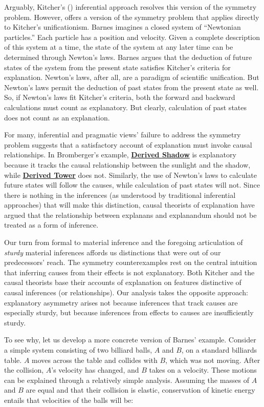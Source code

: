 \documentclass{article}                     %
\begin{document}
Arguably, Kitcher's (\citeyear{Kitcher1989}) inferential approach resolves this version of the symmetry problem. However, \cite{Barnes1992} offers a version of the symmetry problem that applies directly to Kitcher's unificationism.  Barnes imagines a closed system of ``Newtonian particles.''  Each particle has a position and velocity.  Given a complete description of this system at a time, the state of the system at any later time can be determined through Newton's laws.  Barnes argues that the deduction of future states of the system from the present state satisfies Kitcher's criteria for explanation.  Newton's laws, after all, are a paradigm of scientific unification.  But Newton's laws permit the deduction of past states from the present state as well. So, if Newton's laws fit Kitcher's criteria, both the forward and backward calculations must count as explanatory.  But clearly, calculation of past states does not count as an explanation.

For many, inferential and pragmatic views' failure to address the symmetry problem suggests that a satisfactory account of explanation must invoke causal relationships.  In Bromberger's example, \hyperref[eq:shadow_expl]{\textbf{Derived Shadow}}  is explanatory because it tracks the causal relationship between the sunlight and the shadow, while \hyperref[eq:height_expl]{\textbf{Derived Tower}} does not.  Similarly, the use of Newton's laws to calculate future states will follow the causes, while calculation of past states will not.  Since there is nothing in the inferences (as understood by traditional inferential approaches) that will make this distinction, causal theorists of explanation have argued that the relationship between explanans and explanandum should not be treated as a form of inference.

Our turn from formal to material inference and the foregoing articulation of \textit{sturdy} material inferences affords us distinctions that were out of our predecessors' reach.  The symmetry counterexamples rest on the central intuition that inferring causes from their effects is not explanatory. Both Kitcher and the causal theorists base their accounts of explanation on features distinctive of causal inferences (or relationships).  Our analysis takes the opposite approach: explanatory asymmetry arises not because inferences that track causes are especially sturdy, but because inferences from effects to causes are insufficiently sturdy.  

To see why, let us develop a more concrete version of Barnes' example.  Consider a simple system consisting of two billiard balls, $A$ and $B$, on a standard billiards table.  $A$ moves across the table and collides with $B$, which was not moving.  After the collision, $A$'s velocity has changed, and $B$ takes on a velocity.  These motions can be explained through a relatively simple analysis.  Assuming the masses of $A$ and $B$ are equal and that their collision is elastic, conservation of kinetic energy entails that velocities of the balls will be:  
\end{document}
